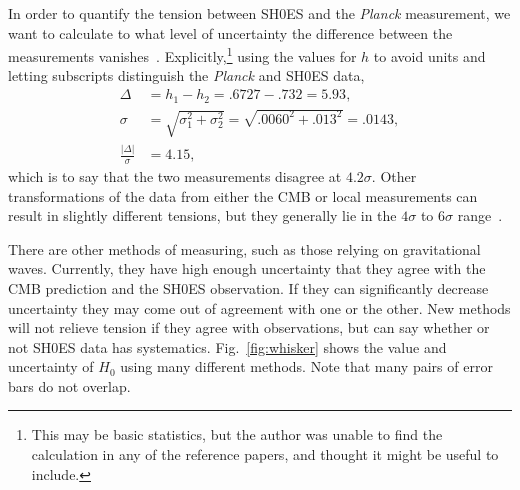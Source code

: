 \documentclass[12pt]{article}
\newcommand{\Planck}[1]{\textit{Planck}}
\newcommand{\nn}{\nonumber\\}
\begin{document}
In order to quantify the tension between SH0ES and the \Planck{} measurement, we want to calculate to what level of uncertainty the difference between the measurements vanishes~\cite{Dietrich2014}. Explicitly,\footnote{This may be basic statistics, but the author was unable to find the calculation in any of the reference papers, and thought it might be useful to include.} using the values for $h$ to avoid units and letting subscripts distinguish the \Planck{} and SH0ES data, 
\begin{align}
\Delta &= h_1 - h_2 = .6727 - .732 = 5.93,\nn
\sigma &= \sqrt{\sigma_1^2 + \sigma_2^2} = \sqrt{.0060^2 + .013^2} = .0143,\nn
\frac{|\Delta|}{\sigma} &= 4.15,
\end{align}
which is to say that the two measurements disagree at $4.2\sigma$. Other transformations of the data from either the CMB or local measurements can result in slightly different tensions, but they generally lie in the $4\sigma$ to $6\sigma$ range~\cite{DiValentino2021}.

There are other methods of measuring, such as those relying on gravitational waves. Currently, they have high enough uncertainty that they agree with the CMB prediction and the SH0ES observation. If they can significantly decrease uncertainty they may come out of agreement with one or the other. New methods
will not relieve tension if they agree with observations, but can say whether or not SH0ES data has  systematics.
Fig.~\ref{fig:whisker} shows the value and uncertainty of $H_0$ using many different methods. Note that many pairs of error bars do not overlap.
\end{document}
